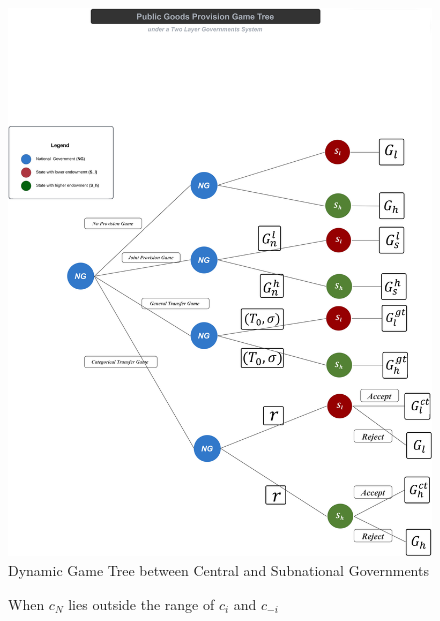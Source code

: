 \begin{landscape}
    \begin{figure}[H]
        \centering
        \includegraphics[scale=0.045]{Chapter-2/Figures/tree.jpg}
        \caption[Dynamic Game Tree of 3 players]{Dynamic Game Tree between Central and Subnational Governments
            \texttt{} }
        \label{dynamicgamenoutility}
    \end{figure}
\end{landscape}
\newpage

\begin{figure}[htbp]
    \centering
    \caption{When $c_N$ lies outside the range of $c_i$ and $c_{-i}$}
    \label{cnci}
\end{figure}


